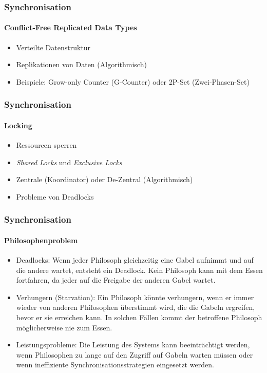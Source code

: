 \begin{frame}
  \frametitle{Synchronisation}
  \framesubtitle{Conflict-Free Replicated Data Types}
  \begin{itemize}
    \item Verteilte Datenstruktur
    \item Replikationen von Daten (Algorithmisch)
    \item Beispiele:  Grow-only Counter (G-Counter) oder 2P-Set (Zwei-Phasen-Set)
   \end{itemize}
\end{frame}  

\begin{frame}
  \frametitle{Synchronisation}
  \framesubtitle{Locking}
  \begin{itemize}
    \item Ressourcen sperren
    \item \textit{Shared Locks} und \textit{Exclusive Locks}
    \item Zentrale (Koordinator) oder De-Zentral (Algorithmisch)
    \item Probleme von Deadlocks
   \end{itemize}
\end{frame}  

\begin{frame}
  \frametitle{Synchronisation}
  \framesubtitle{Philosophenproblem}
    \begin{itemize}
    \item Deadlocks: Wenn jeder Philosoph gleichzeitig eine Gabel aufnimmt und auf die andere wartet, entsteht ein Deadlock. Kein Philosoph kann mit dem Essen fortfahren, da jeder auf die Freigabe der anderen Gabel wartet.
    \item Verhungern (Starvation): Ein Philosoph könnte verhungern, wenn er immer wieder von anderen Philosophen überstimmt wird, die die Gabeln ergreifen, bevor er sie erreichen kann. In solchen Fällen kommt der betroffene Philosoph möglicherweise nie zum Essen.
    \item Leistungsprobleme: Die Leistung des Systems kann beeinträchtigt werden, wenn Philosophen zu lange auf den Zugriff auf Gabeln warten müssen oder wenn ineffiziente Synchronisationsstrategien eingesetzt werden.
    \end{itemize}
\end{frame} 